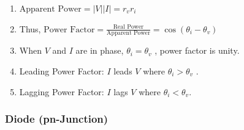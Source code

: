 \documentclass{article}
\begin{document}
\begin{enumerate}
\begin{enumerate}
            \item  $\displaystyle \text{Apparent Power} = |V||I| = r_vr_i$
            \item Thus, $\displaystyle \text{Power Factor} = \frac{\text{Real Power}}{\text{Apparent Power}} = \cos(\theta_i-\theta_v)$ 
            \item When $V$ and $I$ are in phase, $\theta_i = \theta_v$ , power factor is unity.
            \item Leading Power Factor: $I$ leads $V$ where $\theta_i > \theta_v$ .
            \item Lagging Power Factor: $I$ lags $V$ where $\theta_i < \theta_v$.
        \end{enumerate}
\end{enumerate}
\subsubsection{Diode (pn-Junction)}
\end{document}

